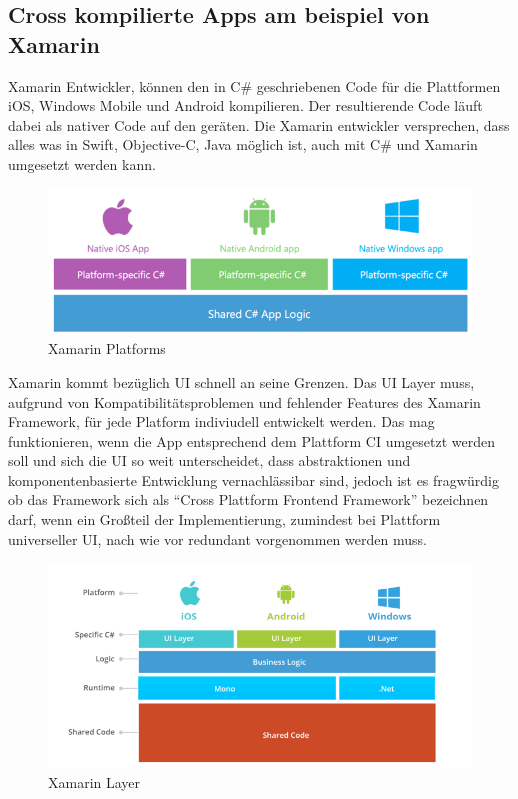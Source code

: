 \subsection{Cross kompilierte Apps am beispiel von Xamarin}

Xamarin Entwickler, können den in C\# geschriebenen Code für die Plattformen iOS, Windows Mobile und Android kompilieren.
Der resultierende Code läuft dabei als nativer Code auf den geräten.
Die Xamarin entwickler versprechen, dass alles was in Swift, Objective-C, Java möglich ist, auch mit C\# und Xamarin umgesetzt werden kann.\cite{projectxamarin}

\begin{figure}[ht]
 \centering
 \includegraphics[width=0.9\linewidth]{kapitel2/csharp_xamarin.png}
 \caption{Xamarin Platforms \cite{7Reas20:online}}
\end{figure}
\vspace{1cm}

Xamarin kommt bezüglich \ac{UI} schnell an seine Grenzen. Das \ac{UI} Layer muss, aufgrund von Kompatibilitätsproblemen und fehlender Features des Xamarin Framework,
für jede Platform indiviudell entwickelt werden. Das mag funktionieren, wenn die App entsprechend dem Plattform CI umgesetzt werden soll und sich die \ac{UI} so weit unterscheidet,
dass abstraktionen und komponentenbasierte Entwicklung vernachlässibar sind, jedoch ist es fragwürdig ob das Framework sich als ``Cross Plattform Frontend Framework'' bezeichnen darf,
wenn ein Großteil der Implementierung, zumindest bei Plattform universeller \ac{UI}, nach wie vor redundant vorgenommen werden muss.\cite{7Reas20:online}

\begin{figure}[ht]
 \centering
 \includegraphics[width=0.8\linewidth]{kapitel2/xamarin_ui_blocker.png}
 \caption{Xamarin Layer \cite{7Reas20:online}}
\end{figure}

